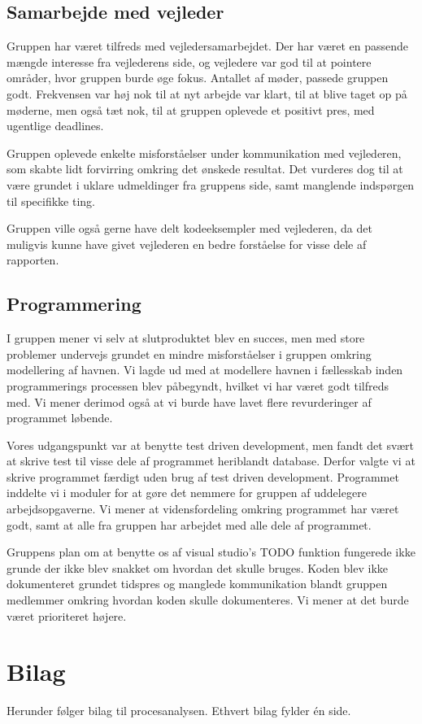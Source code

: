 \documentclass[a4paper,12pt,oneside]{article}
\begin{document}
\subsection{Samarbejde med vejleder}

Gruppen har været tilfreds med vejledersamarbejdet. Der har været en passende mængde interesse fra vejlederens side, og vejledere var god til at pointere områder, hvor gruppen burde øge fokus. Antallet af møder, passede gruppen godt. Frekvensen var høj nok til at nyt arbejde var klart, til at blive taget op på møderne, men også tæt nok, til at gruppen oplevede et positivt pres, med ugentlige deadlines.

Gruppen oplevede enkelte misforståelser under kommunikation med vejlederen, som skabte lidt forvirring omkring det ønskede resultat. Det vurderes dog til at være grundet i uklare udmeldinger fra gruppens side, samt manglende indspørgen til specifikke ting.

Gruppen ville også gerne have delt kodeeksempler med vejlederen, da det muligvis kunne have givet vejlederen en bedre forståelse for visse dele af rapporten.

\subsection{Programmering} 

I gruppen mener vi selv at slutproduktet blev en succes, men med store problemer undervejs grundet en mindre misforståelser i gruppen omkring modellering af havnen. Vi lagde ud med at modellere havnen i fællesskab inden programmerings processen blev påbegyndt, hvilket vi har været godt tilfreds med. Vi mener derimod også at vi burde have lavet flere revurderinger af programmet løbende.

Vores udgangspunkt var at benytte test driven development, men fandt det svært at skrive test til visse dele af programmet heriblandt database. Derfor valgte vi at skrive programmet færdigt uden brug af test driven development. Programmet inddelte vi i moduler for at gøre det nemmere for gruppen af uddelegere arbejdsopgaverne. Vi mener at vidensfordeling omkring programmet har været godt, samt at alle fra gruppen har arbejdet med alle dele af programmet. 

Gruppens plan om at benytte os af visual studio's TODO funktion fungerede ikke grunde der ikke blev snakket om hvordan det skulle bruges. Koden blev ikke dokumenteret grundet tidspres og manglede kommunikation blandt gruppen medlemmer omkring hvordan koden skulle dokumenteres. Vi mener at det burde været prioriteret højere.


\section{Bilag} 
\label{sec:bilag}

Herunder følger bilag til procesanalysen. Ethvert bilag fylder én side.



\label{trello}

\label{samarbejdsaftale}

\label{vejledersamarbejde}
\end{document}
